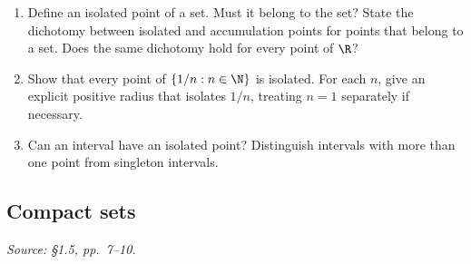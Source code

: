 \begin{enumerate}[resume]
  \item Define an isolated point of a set. Must it belong to the set?
    State the dichotomy between isolated and accumulation points for
    points that belong to a set. Does the same dichotomy hold for every
    point of \(\R\)?

  \item Show that every point of \(\{1/n:n\in\N\}\) is isolated.
    For each \(n\), give an explicit positive radius that isolates \(1/n\),
    treating \(n=1\) separately if necessary.

  \item Can an interval have an isolated point? Distinguish intervals
    with more than one point from singleton intervals.
\end{enumerate}

\subsection{Compact sets}
\textit{Source: \S1.5, pp.~7--10.}

